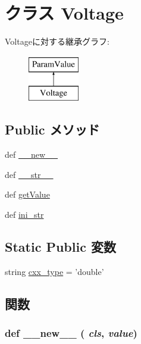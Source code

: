 \hypertarget{classm5_1_1params_1_1Voltage}{
\section{クラス Voltage}
\label{classm5_1_1params_1_1Voltage}
}
Voltageに対する継承グラフ:\begin{figure}[H]
\begin{center}
\leavevmode
\includegraphics[height=2cm]{classm5_1_1params_1_1Voltage}
\end{center}
\end{figure}
\subsection*{Public メソッド}
\begin{DoxyCompactItemize}
\item 
def \hyperlink{classm5_1_1params_1_1Voltage_a2f15a4676204349e06bcced484b06b70}{\_\-\_\-new\_\-\_\-}
\item 
def \hyperlink{classm5_1_1params_1_1Voltage_aa7a4b9bc0941308e362738503137460e}{\_\-\_\-str\_\-\_\-}
\item 
def \hyperlink{classm5_1_1params_1_1Voltage_acc340fbd4335fa34f9d57fb454b28ed0}{getValue}
\item 
def \hyperlink{classm5_1_1params_1_1Voltage_a33ebe6cd32bcbd15465fc28b9d94bf82}{ini\_\-str}
\end{DoxyCompactItemize}
\subsection*{Static Public 変数}
\begin{DoxyCompactItemize}
\item 
string \hyperlink{classm5_1_1params_1_1Voltage_a2f1553ebb79374a68b36fdd6d8d82fc3}{cxx\_\-type} = 'double'
\end{DoxyCompactItemize}


\subsection{関数}
\hypertarget{classm5_1_1params_1_1Voltage_a2f15a4676204349e06bcced484b06b70}{
\subsubsection[{\_\-\_\-new\_\-\_\-}]{\setlength{\rightskip}{0pt plus 5cm}def \_\-\_\-new\_\-\_\- ( {\em cls}, \/   {\em value})}}
\label{classm5_1_1params_1_1Voltage_a2f15a4676204349e06bcced484b06b70}



